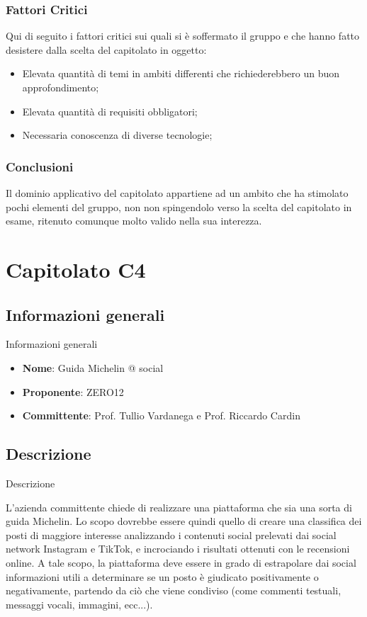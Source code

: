 \documentclass[11pt]{article}
\begin{document}
    \subsubsection{Fattori Critici}
    Qui di seguito i fattori critici sui quali si è soffermato il gruppo e che hanno fatto desistere dalla scelta del capitolato in
    oggetto:
    \begin{itemize}
    	\item Elevata quantità di temi in ambiti differenti che richiederebbero un buon approfondimento;
    	\item Elevata quantità di requisiti obbligatori;
    	\item Necessaria conoscenza di diverse tecnologie;
    \end{itemize}
    
    \subsubsection{Conclusioni}
    Il dominio applicativo del capitolato appartiene ad un ambito che ha stimolato pochi elementi del gruppo, non non spingendolo
    verso la scelta del capitolato in esame, ritenuto comunque molto valido nella sua interezza.    
    
\newpage
    








\section{Capitolato C4}
    \subsection{Informazioni generali} Informazioni generali
    \begin{itemize}
        \item \textbf{Nome}: Guida Michelin @ social
        \item \textbf{Proponente}: ZERO12
        \item \textbf{Committente}: Prof. Tullio Vardanega e Prof. Riccardo Cardin
    \end{itemize}
    \subsection{Descrizione} Descrizione
    
    L’azienda committente chiede di realizzare una piattaforma che sia una sorta di guida Michelin. Lo scopo dovrebbe essere quindi quello di creare una classifica dei posti di maggiore interesse analizzando i contenuti social prelevati dai social network Instagram e TikTok, e incrociando i risultati ottenuti con le recensioni online. A tale scopo, la piattaforma deve essere in grado di estrapolare dai social informazioni utili a determinare se un posto è giudicato positivamente o negativamente, partendo da ciò che viene condiviso (come commenti testuali, messaggi vocali, immagini, ecc...).
    
\end{document}
